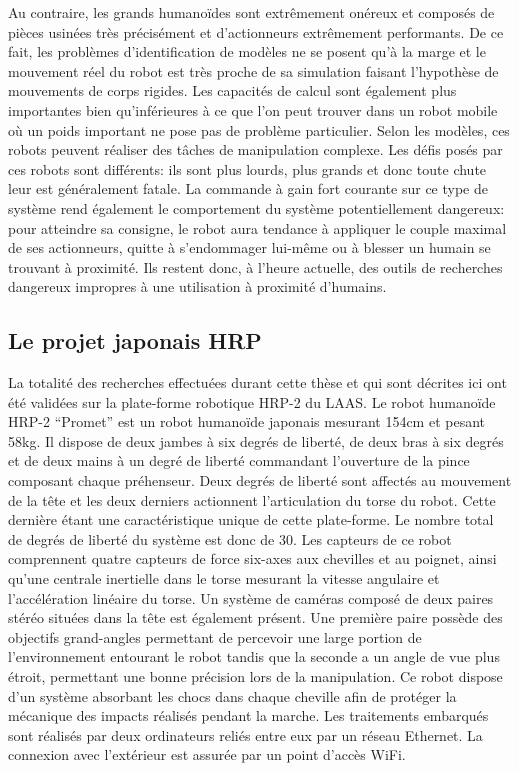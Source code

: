 Au contraire, les grands humanoïdes sont extrêmement onéreux et
composés de pièces usinées très précisément et d'actionneurs
extrêmement performants. De ce fait, les problèmes d'identification de
modèles ne se posent qu'à la marge et le mouvement réel du robot est
très proche de sa simulation faisant l'hypothèse de mouvements de
corps rigides. Les capacités de calcul sont également plus importantes
bien qu'inférieures à ce que l'on peut trouver dans un robot mobile où
un poids important ne pose pas de problème particulier. Selon les
modèles, ces robots peuvent réaliser des tâches de manipulation
complexe. Les défis posés par ces robots sont différents: ils sont
plus lourds, plus grands et donc toute chute leur est généralement
fatale. La commande à gain fort courante sur ce type de système rend
également le comportement du système potentiellement dangereux: pour
atteindre sa consigne, le robot aura tendance à appliquer le couple
maximal de ses actionneurs, quitte à s'endommager lui-même ou à
blesser un humain se trouvant à proximité. Ils restent donc, à l'heure
actuelle, des outils de recherches dangereux impropres à une
utilisation à proximité d'humains.


\subsection{Le projet japonais HRP}

La totalité des recherches effectuées durant cette thèse et qui sont
décrites ici ont été validées sur la plate-forme robotique HRP-2
\citep{1307969} du LAAS. Le robot humanoïde HRP-2 ``Promet'' est un
robot humanoïde japonais mesurant 154cm et pesant 58kg. Il dispose de
deux jambes à six degrés de liberté, de deux bras à six degrés et de
deux mains à un degré de liberté commandant l'ouverture de la pince
composant chaque préhenseur. Deux degrés de liberté sont affectés au
mouvement de la tête et les deux derniers actionnent l'articulation du
torse du robot. Cette dernière étant une caractéristique unique de
cette plate-forme. Le nombre total de degrés de liberté du système est
donc de 30. Les capteurs de ce robot comprennent quatre capteurs de
force six-axes aux chevilles et au poignet, ainsi qu'une centrale
inertielle dans le torse mesurant la vitesse angulaire et
l'accélération linéaire du torse. Un système de caméras composé de
deux paires stéréo situées dans la tête est également présent. Une
première paire possède des objectifs grand-angles permettant de
percevoir une large portion de l'environnement entourant le robot
tandis que la seconde a un angle de vue plus étroit, permettant une
bonne précision lors de la manipulation. Ce robot dispose d'un système
absorbant les chocs dans chaque cheville afin de protéger la mécanique
des impacts réalisés pendant la marche. Les traitements embarqués sont
réalisés par deux ordinateurs reliés entre eux par un réseau
Ethernet. La connexion avec l'extérieur est assurée par un point
d'accès WiFi.


